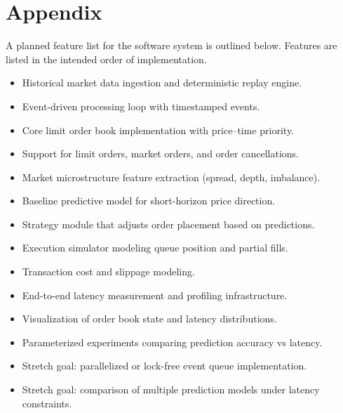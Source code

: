 \documentclass[12pt]{article}
\begin{document}
\section*{Appendix}
A planned feature list for the software system is outlined below. Features are listed in the intended order of implementation.
\begin{itemize}
	
	\item Historical market data ingestion and deterministic replay engine.
	\item Event-driven processing loop with timestamped events.
	\item Core limit order book implementation with price--time priority.
	\item Support for limit orders, market orders, and order cancellations.
	\item Market microstructure feature extraction (spread, depth, imbalance).
	\item Baseline predictive model for short-horizon price direction.
	\item Strategy module that adjusts order placement based on predictions.
	\item Execution simulator modeling queue position and partial fills.
	\item Transaction cost and slippage modeling.
	\item End-to-end latency measurement and profiling infrastructure.
	\item Visualization of order book state and latency distributions.
	\item Parameterized experiments comparing prediction accuracy vs latency.
	\item Stretch goal: parallelized or lock-free event queue implementation.
	\item Stretch goal: comparison of multiple prediction models under latency constraints.

\end{itemize}




\end{document}
